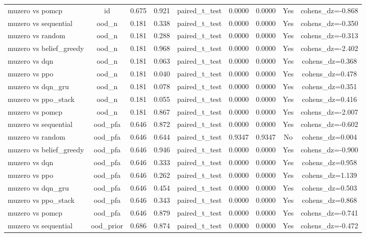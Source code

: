 \begin{table}[htbp]
\begin{tabular}{lcccccccc}
muzero vs pomcp & id & 0.675 & 0.921 & paired_t_test & 0.0000 & 0.0000 & Yes & cohens_dz=-0.868 \\
muzero vs sequential & ood_n & 0.181 & 0.338 & paired_t_test & 0.0000 & 0.0000 & Yes & cohens_dz=-0.350 \\
muzero vs random & ood_n & 0.181 & 0.288 & paired_t_test & 0.0000 & 0.0000 & Yes & cohens_dz=-0.313 \\
muzero vs belief_greedy & ood_n & 0.181 & 0.968 & paired_t_test & 0.0000 & 0.0000 & Yes & cohens_dz=-2.402 \\
muzero vs dqn & ood_n & 0.181 & 0.063 & paired_t_test & 0.0000 & 0.0000 & Yes & cohens_dz=0.368 \\
muzero vs ppo & ood_n & 0.181 & 0.040 & paired_t_test & 0.0000 & 0.0000 & Yes & cohens_dz=0.478 \\
muzero vs dqn_gru & ood_n & 0.181 & 0.078 & paired_t_test & 0.0000 & 0.0000 & Yes & cohens_dz=0.351 \\
muzero vs ppo_stack & ood_n & 0.181 & 0.055 & paired_t_test & 0.0000 & 0.0000 & Yes & cohens_dz=0.416 \\
muzero vs pomcp & ood_n & 0.181 & 0.867 & paired_t_test & 0.0000 & 0.0000 & Yes & cohens_dz=-2.007 \\
muzero vs sequential & ood_pfa & 0.646 & 0.872 & paired_t_test & 0.0000 & 0.0000 & Yes & cohens_dz=-0.602 \\
muzero vs random & ood_pfa & 0.646 & 0.644 & paired_t_test & 0.9347 & 0.9347 & No & cohens_dz=0.004 \\
muzero vs belief_greedy & ood_pfa & 0.646 & 0.946 & paired_t_test & 0.0000 & 0.0000 & Yes & cohens_dz=-0.900 \\
muzero vs dqn & ood_pfa & 0.646 & 0.333 & paired_t_test & 0.0000 & 0.0000 & Yes & cohens_dz=0.958 \\
muzero vs ppo & ood_pfa & 0.646 & 0.262 & paired_t_test & 0.0000 & 0.0000 & Yes & cohens_dz=1.139 \\
muzero vs dqn_gru & ood_pfa & 0.646 & 0.454 & paired_t_test & 0.0000 & 0.0000 & Yes & cohens_dz=0.503 \\
muzero vs ppo_stack & ood_pfa & 0.646 & 0.343 & paired_t_test & 0.0000 & 0.0000 & Yes & cohens_dz=0.868 \\
muzero vs pomcp & ood_pfa & 0.646 & 0.879 & paired_t_test & 0.0000 & 0.0000 & Yes & cohens_dz=-0.741 \\
muzero vs sequential & ood_prior & 0.686 & 0.874 & paired_t_test & 0.0000 & 0.0000 & Yes & cohens_dz=-0.472 \\

\end{tabular}
\end{table}
